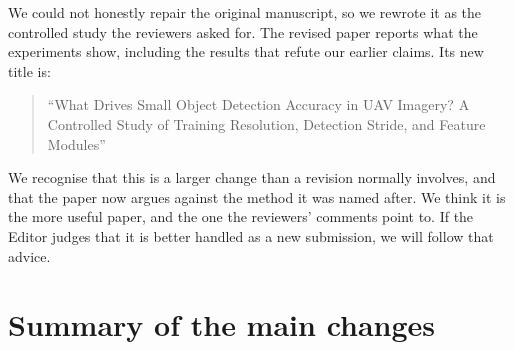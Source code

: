 \documentclass[11pt, a4paper]{article}
\begin{document}
We could not honestly repair the original manuscript, so we rewrote it as the
controlled study the reviewers asked for. The revised paper reports what the
experiments show, including the results that refute our earlier claims. Its new
title is:

\begin{quote}
``What Drives Small Object Detection Accuracy in UAV Imagery? A Controlled Study
of Training Resolution, Detection Stride, and Feature Modules''
\end{quote}

We recognise that this is a larger change than a revision normally involves, and
that the paper now argues against the method it was named after. We think it is
the more useful paper, and the one the reviewers' comments point to. If the
Editor judges that it is better handled as a new submission, we will follow that
advice.

\section*{Summary of the main changes}
\end{document}
